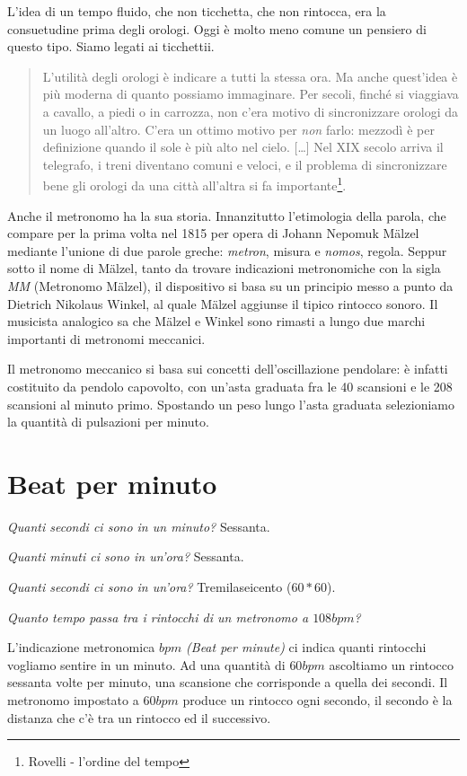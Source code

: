 L'idea di un tempo fluido, che non ticchetta, che non rintocca, era la consuetudine
prima degli orologi. Oggi è molto meno comune un pensiero di questo tipo. Siamo
legati ai ticchettii.
\begin{quote}
L'utilità degli orologi è indicare a tutti la stessa ora. Ma anche quest'idea è
più moderna di quanto possiamo immaginare. Per secoli, finché si viaggiava a
cavallo, a piedi o in carrozza, non c'era motivo di sincronizzare orologi da un
luogo all'altro. C'era un ottimo motivo per \emph{non} farlo: mezzodì è per
definizione quando il sole è più alto nel cielo. [\ldots] Nel XIX secolo arriva
il telegrafo, i treni diventano comuni e veloci, e il problema di sincronizzare
bene gli orologi da una città all'altra si fa importante\footnote{Rovelli - l'ordine del tempo}.
\end{quote}

Anche il metronomo ha la sua storia. Innanzitutto l'etimologia della parola,
che compare per la prima volta nel 1815 per opera di Johann Nepomuk M\"{a}lzel
mediante l'unione di due parole greche: \emph{metron}, misura e \emph{nomos}, regola.
Seppur sotto il nome di M\"{a}lzel, tanto da trovare indicazioni metronomiche
con la sigla \emph{MM} (Metronomo M\"{a}lzel), il dispositivo si basa su un
principio messo a punto da Dietrich Nikolaus Winkel, al quale M\"{a}lzel aggiunse
il tipico rintocco sonoro. Il musicista analogico sa che M\"{a}lzel e Winkel sono
rimasti a lungo due marchi importanti di metronomi meccanici.

Il metronomo meccanico si basa sui concetti dell'oscillazione pendolare:
è infatti costituito da pendolo capovolto, con un'asta graduata fra le 40 scansioni
e le 208 scansioni al minuto primo. Spostando un peso lungo l'asta graduata
selezioniamo la quantità di pulsazioni per minuto.

\section{Beat per minuto}

\emph{Quanti secondi ci sono in un minuto?} Sessanta.

\emph{Quanti minuti ci sono in un'ora?} Sessanta.

\emph{Quanti secondi ci sono in un'ora?} Tremilaseicento ($60*60$).

\emph{Quanto tempo passa tra i rintocchi di un metronomo a $108bpm$?}

L'indicazione metronomica $bpm$ \emph{(Beat per minute)} ci indica quanti rintocchi
vogliamo sentire in un minuto. Ad una quantità di $60bpm$ ascoltiamo un rintocco
sessanta volte per minuto, una scansione che corrisponde a quella dei secondi.
Il metronomo impostato a $60bpm$ produce un rintocco ogni secondo, il secondo è
la distanza che c'è tra un rintocco ed il successivo.


